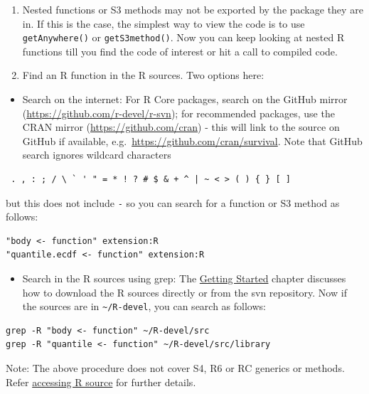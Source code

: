 \documentclass[
]{book}
\providecommand{\tightlist}{%
  \setlength{\itemsep}{0pt}\setlength{\parskip}{0pt}}
\begin{document}
\begin{enumerate}
\def\labelenumi{\arabic{enumi}.}
\setcounter{enumi}{1}
\item
  Nested functions or S3 methods may not be exported by the package they are in. If this is the case, the simplest way to view the code is to use \texttt{getAnywhere()} or \texttt{getS3method()}. Now you can keep looking at nested R functions till you find the code of interest or hit a call to compiled code.
\item
  Find an R function in the R sources. Two options here:
\end{enumerate}

\begin{itemize}
\tightlist
\item
  Search on the internet: For R Core packages, search on the GitHub mirror (\url{https://github.com/r-devel/r-svn}); for recommended packages, use the CRAN mirror (\url{https://github.com/cran}) - this will link to the source on GitHub if available, e.g.~\url{https://github.com/cran/survival}. Note that GitHub search ignores wildcard characters
\end{itemize}

\begin{verbatim}
 . , : ; / \ ` ' " = * ! ? # $ & + ^ | ~ < > ( ) { } [ ]
\end{verbatim}

but this does not include \texttt{-} so you can search for a function or S3 method as follows:

\begin{verbatim}
"body <- function" extension:R
"quantile.ecdf <- function" extension:R
\end{verbatim}

\begin{itemize}
\tightlist
\item
  Search in the R sources using grep: The \protect\hyperlink{GetStart}{Getting Started} chapter discusses how to download the R sources directly or from the svn repository. Now if the sources are in \texttt{\textasciitilde{}/R-devel}, you can search as follows:
\end{itemize}

\begin{verbatim}
grep -R "body <- function" ~/R-devel/src
grep -R "quantile <- function" ~/R-devel/src/library
\end{verbatim}

Note: The above procedure does not cover S4, R6 or RC generics or methods. Refer \href{https://github.com/jennybc/access-r-source}{accessing R source} for further details.
\end{document}

